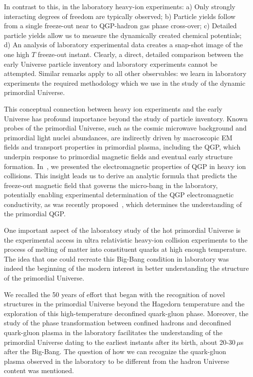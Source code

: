 {\color{blue}In contrast to this, in the laboratory heavy-ion experiments: a) Only strongly interacting degrees of freedom are typically observed; b) Particle yields follow from a single freeze-out near to QGP-hadron gas phase cross-over; c) Detailed particle yields allow us to measure the dynamically created chemical potentials; d) An analysis of laboratory experimental data creates a snap-shot image of the one high $T$ freeze-out instant. Clearly, a direct, detailed comparison between the early Universe particle inventory and laboratory experiments cannot be attempted. Similar remarks apply to all other observables: we learn in laboratory experiments the required methodology which we use in the study of the dynamic primordial Universe.}

{\color{blue} This conceptual connection between heavy ion experiments and the early Universe has profound importance beyond the study of particle inventory. Known probes of the primordial Universe, such as the cosmic microwave background and primordial light nuclei abundances, are indirectly driven by macroscopic EM fields and transport properties in primordial plasma, including the QGP, which underpin response to primordial magnetic fields and eventual early structure formation. In~, we presented the electromagnetic properties of QGP in heavy ion collisions. This insight leads us to derive an analytic formula that predicts the freeze-out magnetic field that governs the micro-bang in the laboratory, potentially enabling experimental determination of the QGP electromagnetic conductivity, as was recently proposed~\cite{STAR:2023jdd}, which determines the  understanding of the primordial QGP.}

One important aspect of the laboratory study of the hot primordial Universe is the experimental access in ultra relativistic heavy-ion collision experiments to the process of melting of matter into constituent quarks at high enough temperature. The idea that one could recreate this Big-Bang condition in laboratory was indeed the beginning of the modern interest in better understanding the structure of the primordial Universe. 

We recalled the 50 years of effort that began with the recognition of novel structures in the primordial Universe beyond the Hagedorn temperature and the exploration of this high-temperature deconfined quark-gluon phase. Moreover, the study of the phase transformation between confined hadrons and deconfined quark-gluon plasma in the laboratory facilitates the understanding of the primordial Universe dating to the earliest instants after its birth, about 20-30\,$\mu$s after the Big-Bang. The question of how we can recognize the quark-gluon plasma observed in the laboratory to be different from the hadron Universe content was mentioned.

